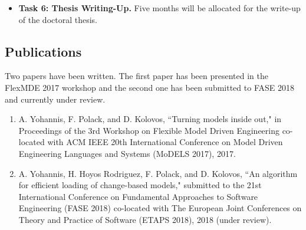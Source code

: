 \documentclass[12pt, a4paper]{report} \usepackage[titletoc]{appendix}
\begin{document}
\begin{itemize}
    \item \textbf{Task 6: Thesis Writing-Up.} Five months will be allocated for the write-up of the doctoral thesis.  
\end{itemize}




\begin{appendices}
    \chapter{Publications}
    \label{ch:publications}
    Two papers have been written. The first paper \cite{yohannis2017turning} has been presented in the FlexMDE 2017 workshop and the second one \cite{yohannis2018algorithm} has been submitted to FASE 2018 and currently under review.
    \begin{enumerate}
        \item A. Yohannis, F. Polack, and D. Kolovos, ``Turning models inside out," in Proceedings of the 3rd Workshop on Flexible Model Driven Engineering co-located with ACM IEEE 20th International Conference on Model Driven Engineering Languages and Systems (MoDELS 2017), 2017.
        \item  A. Yohannis, H. Hoyos Rodriguez, F. Polack, and D. Kolovos, ``An algorithm for efficient loading of change-based models," submitted to the 21st International Conference on Fundamental Approaches to Software Engineering (FASE 2018) co-located with The European Joint Conferences on Theory and Practice of Software (ETAPS 2018), 2018 (under review).
    \end{enumerate}
\end{appendices}

\end{document}
